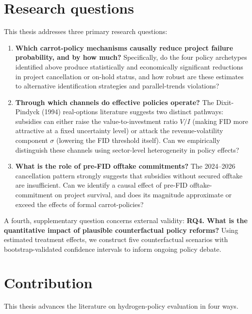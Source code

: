 \section{Research questions}

This thesis addresses three primary research questions:

\begin{enumerate}[label=\textbf{RQ\arabic*.}, leftmargin=*]
\item \textbf{Which carrot-policy mechanisms causally reduce project failure probability, and by how much?} Specifically, do the four policy archetypes identified above produce statistically and economically significant reductions in project cancellation or on-hold status, and how robust are these estimates to alternative identification strategies and parallel-trends violations?

\item \textbf{Through which channels do effective policies operate?} The Dixit-Pindyck (1994) real-options literature suggests two distinct pathways: subsidies can either raise the value-to-investment ratio $V/I$ (making FID more attractive at a fixed uncertainty level) or attack the revenue-volatility component $\sigma$ (lowering the FID threshold itself). Can we empirically distinguish these channels using sector-level heterogeneity in policy effects?

\item \textbf{What is the role of pre-FID offtake commitments?} The 2024--2026 cancellation pattern strongly suggests that subsidies without secured offtake are insufficient. Can we identify a causal effect of pre-FID offtake-commitment on project survival, and does its magnitude approximate or exceed the effects of formal carrot-policies?
\end{enumerate}

A fourth, supplementary question concerns external validity: \textbf{RQ4. What is the quantitative impact of plausible counterfactual policy reforms?} Using estimated treatment effects, we construct five counterfactual scenarios with bootstrap-validated confidence intervals to inform ongoing policy debate.

\section{Contribution}

This thesis advances the literature on hydrogen-policy evaluation in four ways.

